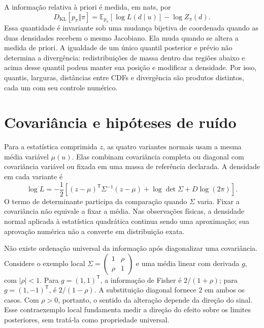 A informação relativa à priori é medida, em nats, por
\begin{equation}
 D_{\mathrm{KL}}[p_\pi\Vert\pi]
 =\mathbb E_{p_\pi}[\log L(d\mid u)]-\log Z_\pi(d).
 \label{eq:c09-kl-priori}
\end{equation}
Essa quantidade é invariante sob uma mudança bijetiva de coordenada quando
as duas densidades recebem o mesmo Jacobiano. Ela muda quando se altera a
medida de priori. A igualdade de um único quantil posterior e prévio não
determina a divergência: redistribuições de massa dentro das regiões abaixo
e acima desse quantil podem manter sua posição e modificar a densidade.
Por isso, quantis, larguras, distâncias entre CDFs e divergência são produtos
distintos, cada um com seu controle numérico.

\section{Covariância e hipóteses de ruído}
\label{sec:c09-fatorial}

Para a estatística comprimida \(z\), as quatro variantes normais usam a
mesma média variável \(\mu(u)\). Elas combinam covariância completa ou
diagonal com covariância variável ou fixada em uma massa de referência
declarada. A densidade em cada variante é
\begin{equation}
 \log L=-\frac12\left[
 (z-\mu)^{\mathsf T}\Sigma^{-1}(z-\mu)
 +\log\det\Sigma+D\log(2\pi)\right].
 \label{eq:c09-normal-fatorial}
\end{equation}
O termo de determinante participa da comparação quando \(\Sigma\) varia.
Fixar a covariância não equivale a fixar a média. Nas observações físicas,
a densidade normal aplicada à estatística quadrática continua sendo uma
aproximação; sua aprovação numérica não a converte em distribuição exata.

Não existe ordenação universal da informação após diagonalizar uma
covariância. Considere o exemplo local
\(\Sigma=\left(\begin{smallmatrix}1&\rho\\\rho&1\end{smallmatrix}\right)\)
e uma média linear com derivada \(g\), com \(|\rho|<1\). Para
\(g=(1,1)^{\mathsf T}\), a informação de Fisher é
\(2/(1+\rho)\); para \(g=(1,-1)^{\mathsf T}\), é
\(2/(1-\rho)\). A substituição diagonal fornece \(2\) em ambos os casos.
Com \(\rho>0\), portanto, o sentido da alteração depende da direção do
sinal. Esse contraexemplo local fundamenta medir a direção do efeito sobre
os limites posteriores, sem tratá-la como propriedade universal.

